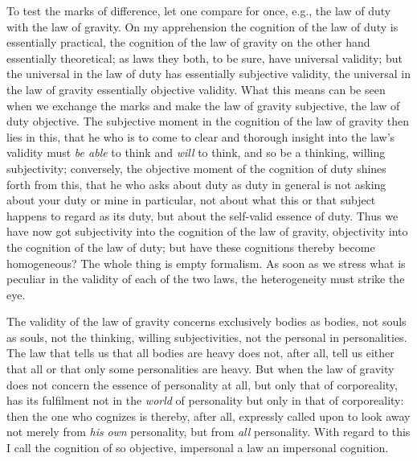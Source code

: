 \documentclass[12pt]{book}
\newcommand{\opage}[1]{\marginnote{\footnotesize\textit{[#1]}}}
\begin{document}
To test the marks of difference, let one compare for once, e.g., the law
of duty with the law of gravity. On my apprehension the cognition of the
law of duty is essentially practical, the cognition of the law of gravity
on the other hand essentially theoretical; as laws they both, to be sure,
have universal validity; but the universal in the law of duty has
essentially subjective validity, the universal in the law of gravity
essentially objective validity. What this means can be seen when we
exchange the marks and make the law of gravity subjective, the law of
duty objective. The subjective moment in the cognition of the law of
gravity then lies in this, that he who is to come to clear and thorough
insight into the law's validity must \emph{be able} to think and
\emph{will} to think, and so be a thinking, willing subjectivity;
conversely, the objective moment of the cognition of duty shines forth
from this, that he who asks about duty as duty in general is not asking
about your duty or mine in particular, not about what this or that
subject happens to regard as its
duty, but about the self-valid essence of duty. Thus we have now got
subjectivity into the cognition of the law of gravity, objectivity into
the cognition of the law of duty; but have these cognitions thereby
become homogeneous? The whole thing is empty formalism. As soon as we
stress what is peculiar in the validity of each of the two laws, the
heterogeneity must strike the eye.

The validity of the law of gravity concerns exclusively bodies as bodies,
not souls as souls, not the thinking, willing subjectivities, not the
personal in
\opage{28}\setcounter{footnote}{0}%
personalities. The law that tells us that all bodies are heavy does not,
after all, tell us either that all or that only some personalities are
heavy. But when the law of gravity does not concern the essence of
personality at all, but only that of corporeality, has its fulfilment not
in the \emph{world} of personality but only in that of corporeality: then
the one who cognizes is thereby, after all, expressly called upon to look
away not merely from \emph{his} \emph{own} personality, but from \emph{all}
personality. With regard to this I call the cognition of so objective,
impersonal a law an impersonal cognition.
\end{document}

